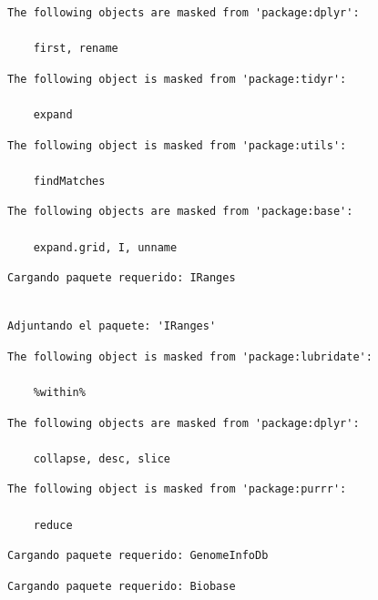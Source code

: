 \documentclass[
  letterpaper,
  DIV=11,
  numbers=noendperiod]{scrartcl}
\begin{document}
\begin{verbatim}
The following objects are masked from 'package:dplyr':

    first, rename
\end{verbatim}

\begin{verbatim}
The following object is masked from 'package:tidyr':

    expand
\end{verbatim}

\begin{verbatim}
The following object is masked from 'package:utils':

    findMatches
\end{verbatim}

\begin{verbatim}
The following objects are masked from 'package:base':

    expand.grid, I, unname
\end{verbatim}

\begin{verbatim}
Cargando paquete requerido: IRanges
\end{verbatim}

\begin{verbatim}

Adjuntando el paquete: 'IRanges'
\end{verbatim}

\begin{verbatim}
The following object is masked from 'package:lubridate':

    %within%
\end{verbatim}

\begin{verbatim}
The following objects are masked from 'package:dplyr':

    collapse, desc, slice
\end{verbatim}

\begin{verbatim}
The following object is masked from 'package:purrr':

    reduce
\end{verbatim}

\begin{verbatim}
Cargando paquete requerido: GenomeInfoDb
\end{verbatim}

\begin{verbatim}
Cargando paquete requerido: Biobase
\end{verbatim}
\end{document}
